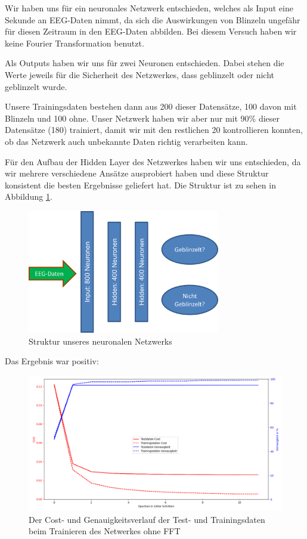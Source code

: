 \documentclass{scrartcl}
\begin{document}
	Wir haben uns für ein neuronales Netzwerk entschieden, welches als Input eine Sekunde an EEG-Daten nimmt, da sich die Auswirkungen von Blinzeln ungefähr für diesen Zeitraum in den EEG-Daten abbilden. Bei diesem Versuch haben wir keine Fourier Transformation benutzt.

	Als Outputs haben wir uns für zwei Neuronen entschieden. Dabei stehen die Werte jeweils für die Sicherheit des Netzwerkes, dass geblinzelt oder nicht geblinzelt wurde.

	Unsere Trainingsdaten bestehen dann aus 200 dieser Datensätze, 100 davon mit Blinzeln und 100 ohne. Unser Netzwerk haben wir aber nur mit 90\% dieser Datensätze (180) trainiert, damit wir mit den restlichen 20 kontrollieren konnten, ob das Netzwerk auch unbekannte Daten richtig verarbeiten kann.

	Für den Aufbau der Hidden Layer des Netzwerkes haben wir uns entschieden, da wir mehrere verschiedene Ansätze ausprobiert haben und diese Struktur konsistent die besten Ergebnisse geliefert hat. Die Struktur ist zu sehen in Abbildung \ref{NetzStruktur}.

	\begin{figure}[h!]
		\includegraphics[width=0.75\textwidth]{pictures/netzwerk-struktur.png}
		\caption{Struktur unseres neuronalen Netzwerks}
		\label{NetzStruktur}
	\end{figure}

	Das Ergebnis war positiv:

	\begin{figure}[h!]
		\includegraphics[width=\textwidth]{pictures/training-nofft.png}
		\caption{Der Cost- und Genauigkeitsverlauf der Test- und Trainingsdaten beim Trainieren des Netwerkes ohne FFT}
		\label{training-nofft}
	\end{figure}
\end{document}
